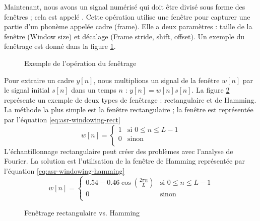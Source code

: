 \documentclass{KodeBook}
\begin{document}
Maintenant, nous avons un signal numérisé qui doit être divisé sous forme des fenêtres ; cela est appelé .
Cette opération utilise une fenêtre pour capturer une partie d'un phonème appelée cadre (frame).
Elle a deux paramètres : taille de la fenêtre (Window size) et décalage (Frame stride, shift, offset).
Un exemple du fenêtrage est donné dans la figure \ref{asr-windowing-exp}.
\begin{figure}[!ht]
	\centering
	\caption[Exemple de l'opération du fenêtrage]{Exemple de l'opération du fenêtrage \cite{2020-jurafsky-martin}}
	\label{asr-windowing-exp}
\end{figure}

Pour extraire un cadre $y[n]$, nous multiplions un signal de la fenêtre $w[n]$ par le signal initial $s[n]$ dans un temps $n$ : $ y[n] = w[n] s[n] $. 
La figure \ref{fig:asr-windowing-rect-hamm} représente un exemple de deux types de fenêtrage : rectangulaire et de Hamming. 
La méthode la plus simple est la fenêtre rectangulaire ; la fenêtre est représentée par l'équation \ref{eq:asr-windowing-rect}
\begin{equation}\label{eq:asr-windowing-rect}
w[n] = \begin{cases}
1 & \text{si } 0 \le n \le L-1 \\
0 & \text{sinon }\\
\end{cases}
\end{equation}
L'échantillonnage rectangulaire peut créer des problèmes avec l'analyse de Fourier. 
La solution est l'utilisation de la fenêtre de Hamming représentée par l'équation \ref{eq:asr-windowing-hamming}
\begin{equation}\label{eq:asr-windowing-hamming}
w[n] = \begin{cases}
0.54 - 0.46 \cos (\frac{2\pi n}{L}) & \text{si } 0 \le n \le L-1 \\
0 & \text{sinon }\\
\end{cases}
\end{equation}

\begin{figure}[!ht]
	\centering
	\caption[Fenêtrage rectangulaire vs. Hamming]{Fenêtrage rectangulaire vs. Hamming \cite{2020-jurafsky-martin}}
	\label{fig:asr-windowing-rect-hamm}
\end{figure}
\end{document}
